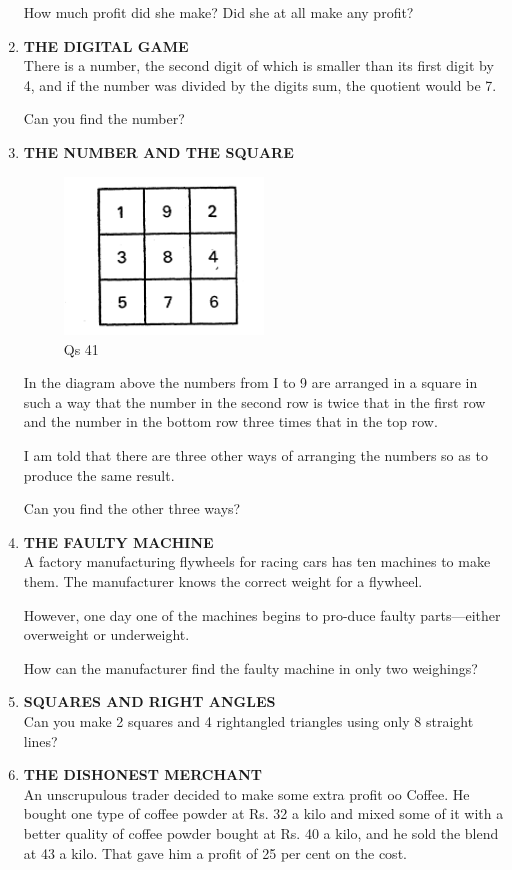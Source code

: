 \documentclass[12pt]{article}
\begin{document}
\begin{enumerate}
How  much  profit  did she make?  Did  she  at all make any profit? 
%
\item \textbf{THE  DIGITAL  GAME} \\
There  is a number,  the second  digit  of which  is smaller than its first  digit  by 4, and if the  number  was  divided  by the digits  sum,  the quotient  would  be 7. 

Can you find  the number? 


\item \textbf{THE  NUMBER  AND  THE  SQUARE} \\
\begin{figure}[h]
\begin{center}
\includegraphics[width=0.5\textwidth]{sdevi_q41.png}
\caption{ Qs 41}
\end{center}
\end{figure}
In the  diagram  above  the  numbers  from  I to 9 are arranged  in a square  in such  a way  that the number  in the second  row is twice  that in the first  row  and  the  number in the bottom  row  three  times  that  in the top row. 

I am told  that  there  are three  other  ways  of arranging the numbers  so as to produce  the same  result. 

Can you find  the other  three  ways? 
%
\item \textbf{THE  FAULTY  MACHINE} \\
A factory  manufacturing  flywheels  for racing  cars  has ten machines  to make  them.  The  manufacturer  knows the correct  weight  for a flywheel. 

However,  one day  one  of the machines  begins  to pro-duce  faulty  parts—either  overweight  or underweight. 

How  can the manufacturer  find  the faulty  machine  in only two weighings? 
%
\item \textbf{SQUARES  AND  RIGHT  ANGLES} \\
Can you  make  2 squares  and  4 rightangled  triangles using  only  8 straight  lines? 
%
\item \textbf{THE  DISHONEST  MERCHANT} \\
An unscrupulous  trader  decided  to make  some  extra profit  oo Coffee.  He  bought  one type  of coffee  powder  at Rs. 32 a kilo  and mixed  some  of it with  a better  quality of coffee  powder  bought  at Rs.  40 a kilo,  and he sold the blend  at 43 a kilo.  That  gave  him  a profit  of 25 per cent  on the cost. 


\end{enumerate}
\end{document}
